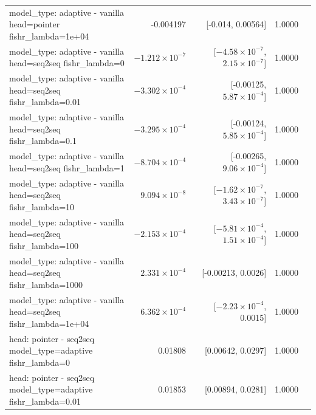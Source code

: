 \documentclass[10pt]{article}
\makeatletter
\newcommand{\stackcell}[1]{\begin{tabular}[t]{@{}l@{}}#1\end{tabular}}
\makeatother
\begin{document}
{\begin{longtable}{lrrrl}
\stackcell{model\_type: adaptive - vanilla\\\footnotesize head=pointer fishr\_lambda=1e+04 } & -0.004197 & [-0.014, 0.00564] & 1.0000 & \\
\stackcell{model\_type: adaptive - vanilla\\\footnotesize head=seq2seq fishr\_lambda=0 } & $-1.212\times10^{-7}$ & [$-4.58\times10^{-7}$, $2.15\times10^{-7}$] & 1.0000 & \\
\stackcell{model\_type: adaptive - vanilla\\\footnotesize head=seq2seq fishr\_lambda=0.01 } & $-3.302\times10^{-4}$ & [-0.00125, $5.87\times10^{-4}$] & 1.0000 & \\
\stackcell{model\_type: adaptive - vanilla\\\footnotesize head=seq2seq fishr\_lambda=0.1 } & $-3.295\times10^{-4}$ & [-0.00124, $5.85\times10^{-4}$] & 1.0000 & \\
\stackcell{model\_type: adaptive - vanilla\\\footnotesize head=seq2seq fishr\_lambda=1 } & $-8.704\times10^{-4}$ & [-0.00265, $9.06\times10^{-4}$] & 1.0000 & \\
\stackcell{model\_type: adaptive - vanilla\\\footnotesize head=seq2seq fishr\_lambda=10 } & $9.094\times10^{-8}$ & [$-1.62\times10^{-7}$, $3.43\times10^{-7}$] & 1.0000 & \\
\stackcell{model\_type: adaptive - vanilla\\\footnotesize head=seq2seq fishr\_lambda=100 } & $-2.153\times10^{-4}$ & [$-5.81\times10^{-4}$, $1.51\times10^{-4}$] & 1.0000 & \\
\stackcell{model\_type: adaptive - vanilla\\\footnotesize head=seq2seq fishr\_lambda=1000 } & $2.331\times10^{-4}$ & [-0.00213, 0.0026] & 1.0000 & \\
\stackcell{model\_type: adaptive - vanilla\\\footnotesize head=seq2seq fishr\_lambda=1e+04 } & $6.362\times10^{-4}$ & [$-2.23\times10^{-4}$, 0.0015] & 1.0000 & \\
\stackcell{head: pointer - seq2seq\\\footnotesize model\_type=adaptive fishr\_lambda=0 } & 0.01808 & [0.00642, 0.0297] & 1.0000 & \\
\stackcell{head: pointer - seq2seq\\\footnotesize model\_type=adaptive fishr\_lambda=0.01 } & 0.01853 & [0.00894, 0.0281] & 1.0000 & \\

\end{longtable}}
\end{document}
